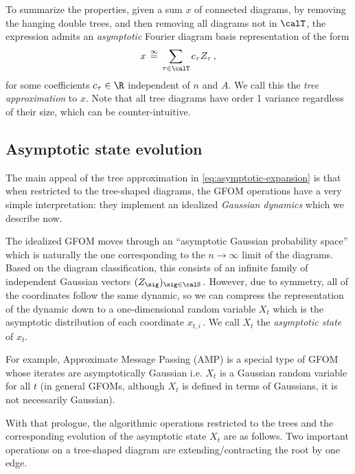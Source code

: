 \documentclass[12pt]{article}
\newcommand{\eqinf}{\,\overset{\infty}{=}\,}
\begin{document}
To summarize the properties, given a sum $x$ of connected diagrams,
by removing the hanging double trees,
and then removing all diagrams not in $\calT$, the expression admits an \emph{asymptotic} Fourier diagram
basis representation of the form
\begin{align}
    x \eqinf \sum_{\tau \in \calT} c_\tau Z_\tau\,,\label{eq:asymptotic-expansion}
\end{align}
for some coefficients $c_\tau\in \R$ independent of $n$ and $A$.
We call this the \emph{tree approximation} to $x$.
Note that all tree diagrams have order 1 variance regardless of their size, which can be counter-intuitive.


\subsection{Asymptotic state evolution}
\label{sec:calculus-rules}


The main appeal of the tree approximation
in \cref{eq:asymptotic-expansion} is that when
restricted to the tree-shaped diagrams, the
GFOM operations have a very simple interpretation:
they implement an idealized {\em Gaussian 
dynamics} which we describe now.

The idealized GFOM moves through an ``asymptotic Gaussian probability space''
which is naturally the one corresponding to the $n \to \infty$ limit
of the diagrams.
Based on the diagram classification, this consists of an infinite family of
independent Gaussian vectors $(Z_\sig)_{\sig \in \calS}\,.$
However, due to symmetry, all of the coordinates follow the same dynamic, so we can compress the representation of the dynamic down to a one-dimensional random variable $X_t$ which is the asymptotic distribution of each coordinate $x_{t,i}\,$.
We call $X_t$ the \emph{asymptotic state} of $x_t$.

For example, Approximate Message Passing (AMP)
is a special type of GFOM whose
iterates are asymptotically Gaussian i.e. $X_t$ is a Gaussian random variable for all $t$ (in general GFOMs, although $X_t$ is defined in terms of Gaussians, it is not necessarily Gaussian).

With that prologue, the algorithmic operations restricted to the trees and the corresponding evolution of the asymptotic state $X_t$ are as follows.
Two important operations on a tree-shaped diagram are extending/contracting
the root by one edge.
\end{document}
